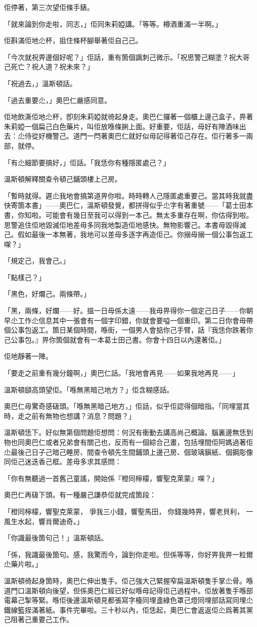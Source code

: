 佢停著，第三次望佢條手錶。

「就來論到你走啦，同志，」佢同朱莉婭講。「等等。樽酒重滿一半啊。」

佢斟滿佢地尐杯，抯住條杯腳舉著佢自己己。

「今次就祝畀邊個好呢？」佢話，重有箇個諷刺己微示。「祝思警己糊塗？祝大哥己死亡？祝人道？祝未來？」

「祝過去，」溫斯頓話。

「過去重要尐，」奧巴仁嚴感同意。

佢地飲澌佢地尐杯，卽刻朱莉婭就徛起身走。奧巴仁攞著一個櫃上邊己盒子，畀著朱莉婭一個扁己白色藥片，叫佢放喺條脷上面。好重要，佢話，毋好有陣酒味出去：尐侍從好機警己。道門一閂著奧巴仁就好似毋記得著佢己存在。佢行著多一兩部，就停。

「有尐細節要搞好，」佢話。「我恁你有種隱匿處己？」

溫斯頓解釋關查令頓己鋪頭樓上己房。

「暫時就得。遲尐我地會搞第道畀你啦。時時轉人己隱匿處重要己。當其時我就盡快寄箇本書」——奧巴仁，溫斯頓發覺，都拼得似乎尐字有著重號——「葛士田本書，你知啦。可能會有幾日至我可以得到一本己。無太多重存在啊，你估得到啦。思警追住佢地毀滅佢地差毋多同我地製造佢地感快。無物影響己。本書毋毀得滅己。假如最後一本無著，我地可以差毋多逐字再造佢己。你搦毋搦一個公事包返工㗎？」

「規定己，我會己。」

「點樣己？」

「黑色，好爛己。兩條帶。」

「黑，兩條，好爛——好。搵一日毋係太遠——我毋畀得你一個定己日子——你朝早尐工作尐信息其中一張會有一個字印錯，你就會要嗌一個重印。第二日你會毋帶個公事包返工。箇日某個時間，喺街，一個男人會掂你己手臂，話『我恁你跌著你己公事包。』畀你箇個就會有一本葛士田己書。你會十四日以內還著佢。」

佢地靜著一陣。

「要走之前重有幾分鐘啊，」奧巴仁話。「我地會再見——如果我地再見——」

溫斯頓𩓥高頭望佢。「喺無黑暗己地方？」佢含糊感話。

奧巴仁毋驚奇感砐頭。「喺無黑暗己地方，」佢話，似乎佢認得個暗指。「同埋當其時，走之前有無物也想講？消息？問題？」

溫斯頓恁下。好似無第個問題佢想問：何況有衝動去講高尚己概論。腦裏邊無恁到物也同奧巴仁或者兄弟會有關己也，反而有一個綜合己畫，包括埋間佢阿媽過著佢尐最後己日子己暗己睡房、間查令頓先生間鋪頭上邊己房、個玻璃鎭紙、個鋼彫像同佢己迷迭香己框。差毋多求其感問：

「你有無聽過一首舊己童謠，開始係『橙同檸檬，響聖克萊蒙』㗎？」

奧巴仁再砐下頭。有一種嚴己謙恭佢就完成箇段：

	「橙同檸檬，響聖克萊蒙，
爭我三小錢，響聖馬田，
你錢幾時畀，響老貝利，
一風生水起，響肖爾迪奇。」

「你識最後箇句己！」溫斯頓話。

「係，我識最後箇句。感，我驚而今，論到你走啦。但係等等，你好畀我畀一粒爾尐藥片啦。」

溫斯頓徛起身箇時，奧巴仁伸出隻手。佢己強大己緊握窄扁溫斯頓隻手掌尐骨。喺道門口溫斯頓向後望，但係奧巴仁經已好似喺毋記得佢己過程中。佢放著隻手喺部電幕己掣等緊。喺佢後邊溫斯頓見都張寫字檯同埋盞綠色罩己燈同埋部話寫同埋尐鐵線籃挃滿著紙。事件完畢啦。三十秒以內，佢恁起，奧巴仁會返返佢尐爲著其黨己阻著己重要己工作。

